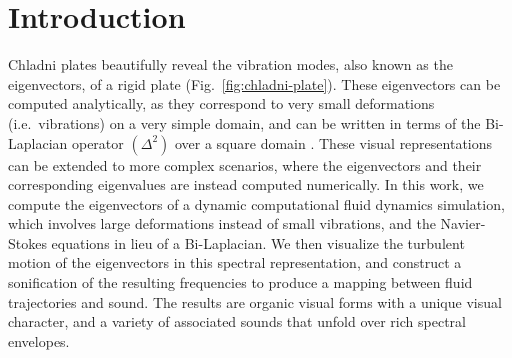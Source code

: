 \documentclass[11pt]{article}
\begin{document}
\section*{Introduction}
Chladni plates beautifully reveal the vibration modes, also known as the eigenvectors, of a rigid plate (Fig.~\ref{fig:chladni-plate}). These eigenvectors can be computed analytically, as they correspond to very small deformations (i.e.~vibrations) on a very simple domain, and can be written in terms of the Bi-Laplacian operator $(\Delta^2)$ over a square domain \cite{gander2012euler}. These visual representations can be extended to more complex scenarios, where the eigenvectors and their corresponding eigenvalues are instead computed numerically. In this work, we compute the eigenvectors of a dynamic computational fluid dynamics simulation, which involves large deformations instead of small vibrations, and the Navier-Stokes equations in lieu of a Bi-Laplacian. We then visualize the turbulent motion of the eigenvectors in this spectral representation, and construct a sonification of the resulting frequencies to produce a mapping between fluid trajectories and sound. The results are organic visual forms with a unique visual character, and a variety of associated sounds that unfold over rich spectral envelopes.
\end{document}
